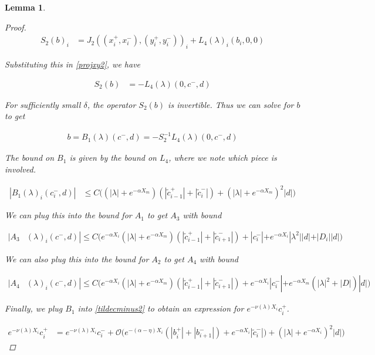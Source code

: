 \documentclass[12pt]{article}
\newtheorem{lemma}{Lemma}
\begin{document}
\begin{lemma}
\begin{proof}
\begin{align*}
S_2(b)_i &= J_2( (x_i^+, x_i^-),(y_i^+, y_i^-))_i 
+ L_4(\lambda)_i(b_i, 0, 0) 
\end{align*}

Substituting this in \eqref{projxy2}, we have

\begin{align*}
S_2(b) &= -L_4(\lambda)(0, c^-, d)
\end{align*}

For sufficiently small $\delta$, the operator $S_2(b)$ is invertible. Thus we can solve for $b$ to get

\begin{align}
b = B_1(\lambda)(c^-,d) 
= -S_2^{-1} L_4(\lambda)(0, c^-, d)
\end{align}

The bound on $B_1$ is given by the bound on $L_4$, where we note which piece is involved.

\begin{align*}
|B_1(\lambda)_i(c_i^-, d)| &\leq C \Big( (|\lambda| + e^{-\alpha X_m})(|\tilde{c}_{i-1}^+| + |\tilde{c}_i^-|)+ (|\lambda| + e^{-\alpha X_m})^2 |d| \Big)
\end{align*}

We can plug this into the bound for $A_1$ to get $A_3$ with bound

\begin{align*}
|A_3&(\lambda)_i(c^-, d)|
\leq C \Big(  
e^{-\alpha X_i} (|\lambda| + e^{-\alpha X_m})(|\tilde{c}_{i-1}^+| + |\tilde{c}_{i+1}^-|) +|c_i^-| + e^{-\alpha X_i} |\lambda^2||d| + |D_i||d| \Big)
\end{align*} 

We can also plug this into the bound for $A_2$ to get $A_4$ with bound

\begin{align*}
|A_4&(\lambda)_i(c^-, d)|
\leq C \Big( 
e^{-\alpha X_i} (|\lambda| + e^{-\alpha X_m})(|\tilde{c}_{i-1}^+| + |\tilde{c}_{i+1}^-|) + e^{-\alpha X_i} |c_i^-| + e^{-\alpha X_m}(|\lambda|^2 + |D|)|d| \Big)
\end{align*} 

Finally, we plug $B_1$ into \eqref{tildecminus2} to obtain an expression for $e^{-\nu(\lambda)X_i} c_i^+$.

\begin{align}\label{tildecminus2}
e^{-\nu(\lambda)X_i} c_i^+
&= e^{-\nu(\lambda)X_i} c_i^- + \mathcal{O}\Big( 
e^{-(\alpha - \eta) X_i} (|b_i^+| + |b_{i+1}^-|) + e^{-\alpha X_i} |\tilde{c}_i^-|) 
+ ( |\lambda| + e^{-\alpha X_i} )^2 |d| \Big)
\end{align}



\end{proof}
\end{lemma}
\end{document}
